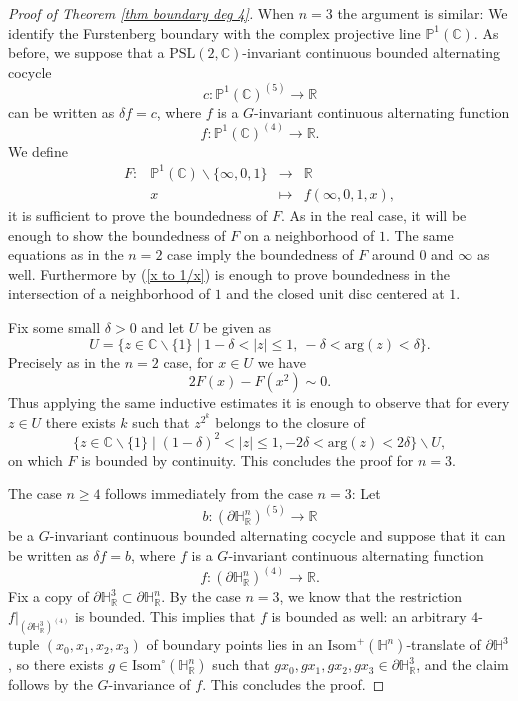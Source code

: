\documentclass[a4paper]{amsart}
\theoremstyle{definition}
\theoremstyle{remark}
\theoremstyle{TheoremNum}
\renewcommand{\setminus}{\smallsetminus}
\begin{document}
\begin{proof}[Proof of Theorem \ref{thm boundary deg 4}]
When $n=3$ the argument is similar:  We identify the Furstenberg boundary with the complex projective line $\mathbb{P}^1(\mathbb{C})$. As before, we suppose that a $\mathrm{PSL}(2,\mathbb{C})$-invariant continuous bounded alternating cocycle 
$$
c:\mathbb{P}^1(\mathbb{C})^{(5)} \longrightarrow \mathbb{R}
$$
can be written as $\delta f=c$, where $f$ is a $G$-invariant continuous alternating function
$$
f:\mathbb{P}^1(\mathbb{C})^{(4)} \longrightarrow \mathbb{R}.
$$
We define 
$$\begin{array}{rrcl}
F: &\mathbb{P}^1(\mathbb{C}) \setminus \{\infty,0,1 \} &\longrightarrow& \mathbb{R}\\
&x&\longmapsto &f(\infty,0,1,x),
\end{array}$$
it is sufficient to prove the boundedness of $F$. As in the real case, it will be enough to show the boundedness of $F$ on a neighborhood of $1$. The same equations as in the $n=2$ case imply the boundedness of $F$ around $0$ and $\infty$ as well. Furthermore by (\ref{x to 1/x}) is enough to prove boundedness in the intersection of a neighborhood of $1$ and the closed unit disc centered at $1$. 

Fix some small $\delta>0$ and let $U$ be  given as
$$U=\{z\in \mathbb{C}\setminus \{1\} \mid 1-\delta <|z|\leq 1, \ -\delta < \mathrm{arg}(z)<\delta\}.$$
Precisely as in the $n=2$ case, for $x\in U$ we have
$$
2F(x)-F(x^2) \sim 0.
$$
Thus applying the same inductive estimates  it is enough to observe that for every $z\in U$ there exists $k$ such that $z^{2^k}$ belongs to the closure of 
$$\{ z\in \mathbb{C}\setminus \{1\} \mid (1-\delta)^2<|z|\leq 1, -2\delta < \mathrm{arg}(z) < 2\delta\} \setminus U,$$
on which $F$ is bounded by continuity. This concludes the proof for $n=3$.

The case $n \geq 4$ follows immediately from the case $n=3$: Let 
$$
b:(\partial \mathbb{H}^n_{\mathbb{R}})^{(5)} \longrightarrow \mathbb{R}
$$
be a $G$-invariant continuous bounded alternating cocycle and suppose that it can be written as $\delta f=b$, where $f$ is a $G$-invariant continuous alternating function
$$
f: (\partial \mathbb{H}^n_{\mathbb{R}})^{(4)} \longrightarrow \mathbb{R}. 
$$
Fix a copy of $\partial \mathbb{H}^3_{\mathbb{R}} \subset \partial \mathbb{H}^n_{\mathbb{R}}$. By the case $n=3$, we know that the restriction $f|_{(\partial \mathbb{H}^3_{\mathbb{R}})^{(4)}}$ is bounded. This implies that $f$ is bounded as well: an arbitrary $4$-tuple $(x_0,x_1,x_2,x_3)$ of boundary points lies in an $\mathrm{Isom}^+(\mathbb{H}^n)$-translate of $\partial \mathbb{H}^3$, so there exists $g \in \mathrm{Isom}^\circ(\mathbb{H}^n_{\mathbb{R}})$ such that $gx_0,gx_1,gx_2,gx_3 \in \partial \mathbb{H}^3_{\mathbb{R}}$, and the claim follows by the $G$-invariance of $f$. This concludes the proof.
\end{proof}
\end{document}
